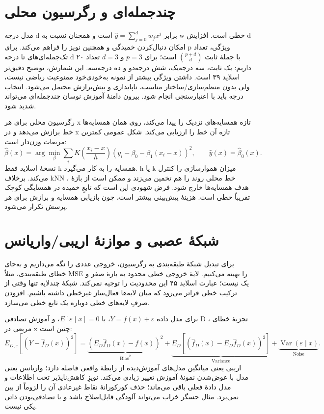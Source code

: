 \section{چندجمله‌ای و رگرسیون محلی}

مدل درجه d برابر \(\widehat y=\sum_{j=0}^d w_jx^j\) است و همچنان نسبت به w خطی است. افزایش d امکان دنبال‌کردن خمیدگی و همچنین نویز را فراهم می‌کند. برای p ویژگی، تعداد تک‌جمله‌ای‌های تا درجه d با جملهٔ ثابت \(\binom{p+d}{d}\) است؛ برای $p=3$ و $d=3$ تعداد ۲۰ داریم: یک ثابت، سه درجه‌یک، شش درجه‌دو و ده درجه‌سه. این شمارش، توضیح دقیق‌تر اسلاید ۳۹ است. داشتن ویژگی بیشتر از نمونه به‌خودی‌خود ممنوعیت ریاضی نیست، ولی بدون منظم‌سازی/ساختار مناسب، ناپایداری و بیش‌برازش محتمل می‌شود. انتخاب درجه باید با اعتبارسنجی انجام شود. بیرون دامنهٔ آموزش نوسان چندجمله‌ای می‌تواند شدید شود.

رگرسیون محلی برای هر x تازه همسایه‌های نزدیک را پیدا می‌کند، روی همان همسایه‌ها خط برازش می‌دهد و در x تازه آن خط را ارزیابی می‌کند. شکل عمومی کمترین مربعات وزن‌دار است: \[
\widehat\beta(x)=\arg\min_\beta\sum_i K\!\left(\frac{x_i-x}{h}\right)(y_i-\beta_0-\beta_1(x_i-x))^2,
\qquad\widehat y(x)=\widehat\beta_0(x).
\] نسخهٔ اسلاید فقط k همسایه را به کار می‌گیرد. h یا k میزان هموارسازی را کنترل می‌کند. برخلاف kNN ، خط محلی روند را هم تخمین می‌زند و ممکن است از بازهٔ هدف همسایه‌ها خارج شود. فرض شهودی این است که تابعِ خمیده در همسایگی کوچک تقریباً خطی است. هزینهٔ پیش‌بینی بیشتر است، چون بازیابی همسایه و برازش برای هر پرسش تکرار می‌شود.

\section{شبکهٔ عصبی و موازنهٔ اریبی/واریانس}

برای تبدیل شبکهٔ طبقه‌بندی به رگرسیون، خروجی عددی را نگه می‌داریم و به‌جای خطای طبقه‌بندی، مثلاً MSE را بهینه می‌کنیم. لایهٔ خروجی خطی محدود به بازهٔ صفر و یک نیست؛ عبارت اسلاید ۴۵ این محدودیت را توجیه نمی‌کند. شبکهٔ چندلایه تنها وقتی از ترکیب خطی فراتر می‌رود که میان لایه‌ها فعال‌ساز غیرخطی داشته باشیم. افزودن صرفِ لایه‌های خطی دوباره یک تابع خطی می‌سازد.

برای مدل داده \(Y=f(x)+\varepsilon\)، با \(E[\varepsilon\mid x]=0\)، و آموزش تصادفی D ، تجزیهٔ خطای مربعی در x چنین است: \[
E_{D,\varepsilon}[(Y-\widehat f_D(x))^2]
=\underbrace{(E_D\widehat f_D(x)-f(x))^2}_{\mathrm{Bias}^2}
+\underbrace{E_D[(\widehat f_D(x)-E_D\widehat f_D(x))^2]}_{\mathrm{Variance}}
+\underbrace{\operatorname{Var}(\varepsilon\mid x)}_{\mathrm{Noise}}.
\] اریبی یعنی میانگین مدل‌های آموزش‌دیده از رابطهٔ واقعی فاصله دارد؛ واریانس یعنی مدل با عوض‌شدن نمونهٔ آموزش تغییر زیادی می‌کند. نویزِ کاهش‌ناپذیر تحت اطلاعات و مدل دادهٔ فعلی باقی می‌ماند؛ حذف کورکورانهٔ نقاط غیرعادی آن را لزوماً از بین نمی‌برد. مثال حسگر خراب می‌تواند آلودگی قابل‌اصلاح باشد و با تصادفی‌بودن ذاتی یکی نیست.

